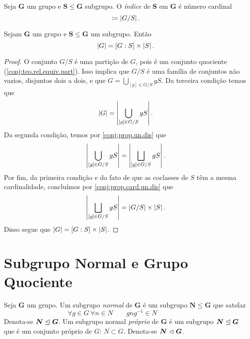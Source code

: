 \begin{defi}
Seja $\bm G$ um grupo e $\bm S \leq \bm G$ subgrupo. O \emph{índice} de $\bm S$ em $\bm G$ é número cardinal
	\begin{equation*}
	[G : S] \coloneqq \card{G/S}.
	\end{equation*}
\end{defi}

\begin{prop}
Sejam $\bm G$ um grupo e $\bm S \leq \bm G$ um subgrupo. Então
	\begin{equation*}
	\left\vert{G}\right\vert=[G:S] \times \left\vert{S}\right\vert.
	\end{equation*}
\end{prop}
\begin{proof}
O conjunto $G/S$ é uma partição de $G$, pois é um conjunto quociente (\ref{conj:teo.rel.equiv.part}). Isso implica que $G/S$ é uma família de conjuntos não vazios, disjuntos dois a dois, e que $G = \bigcup_{[g] \in G/S} gS$. Da terceira condição temos que
	\begin{equation*}
	\left\vert{G}\right\vert = \left\vert{\bigcup_{[g] \in G/S} gS}\right\vert.
	\end{equation*}
Da segunda condição, temos por \ref{conj:prop.un.dis} que
	\begin{equation*}
	\left\vert{\bigcup_{[g] \in G/S} gS}\right\vert = \left\vert{\bigsqcup_{[g] \in G/S} gS}\right\vert.
	\end{equation*}
Por fim, da primeira condição e do fato de que as coclasses de $S$ têm a mesma cardinalidade, concluímos por \ref{conj:prop.card.un.dis} que
	\begin{equation*}
	\left\vert{\bigsqcup_{[g] \in G/S} gS}\right\vert = \left\vert{G/S}\right\vert \times \left\vert{S}\right\vert.
	\end{equation*}
Disso segue que $\left\vert{G}\right\vert=[G:S] \times \left\vert{S}\right\vert$.
\end{proof}

\section{Subgrupo Normal e Grupo Quociente}

\begin{defi}
Seja $\bm G$ um grupo. Um subgrupo \emph{normal} de $\bm G$ é um subgrupo $\bm N \leq \bm G$ que satsfaz
	\begin{equation*}
	\tag{Normalidade} \forall g \in G\ \forall n  \in N \qquad gng^{-1} \in N \qquad\qquad \label{SGN}
	\end{equation*}
\noindent
Denota-se $\bm N \mathrel{\unlhd} \bm G$. Um subgrupo normal \emph{próprio} de $\bm G$ é um subgrupo $\bm N \mathrel{\unlhd} \bm G$ que é um conjunto próprio de $G$: $N \subset G$. Denota-se $\bm N \mathrel{\lhd} \bm G$.
\end{defi}

